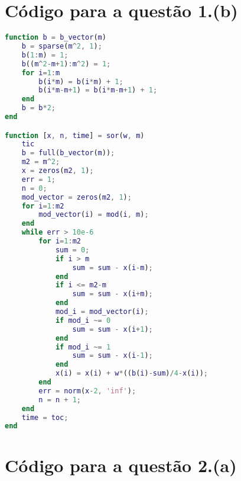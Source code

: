 \documentclass{article}
\begin{document}
    \appendix

    \section{Código para a questão 1.(b)}
        \label{appendix:a}

        \begin{lstlisting}[language=Matlab]
function b = b_vector(m)
    b = sparse(m^2, 1);
    b(1:m) = 1;
    b((m^2-m+1):m^2) = 1;
    for i=1:m
        b(i*m) = b(i*m) + 1;
        b(i*m-m+1) = b(i*m-m+1) + 1;
    end
    b = b*2;
end

function [x, n, time] = sor(w, m)
    tic
    b = full(b_vector(m));
    m2 = m^2;
    x = zeros(m2, 1);
    err = 1;
    n = 0;
    mod_vector = zeros(m2, 1);
    for i=1:m2
        mod_vector(i) = mod(i, m);
    end
    while err > 10e-6
        for i=1:m2
            sum = 0;
            if i > m
                sum = sum - x(i-m);
            end
            if i <= m2-m
                sum = sum - x(i+m);
            end
            mod_i = mod_vector(i);
            if mod_i ~= 0
                sum = sum - x(i+1);
            end
            if mod_i ~= 1
                sum = sum - x(i-1);
            end
            x(i) = x(i) + w*((b(i)-sum)/4-x(i));
        end
        err = norm(x-2, 'inf');
        n = n + 1;
    end
    time = toc;
end
        \end{lstlisting}

    \section{Código para a questão 2.(a)}
        \label{appendix:b}
\end{document}
